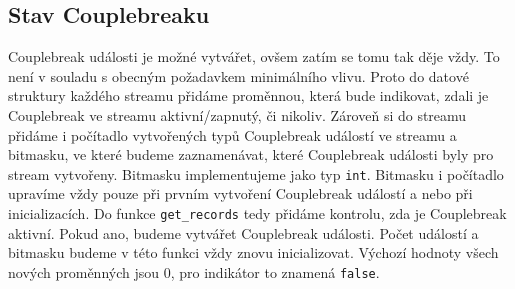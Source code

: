 \subsection{Stav Couplebreaku}
Couplebreak události je možné vytvářet, ovšem zatím se tomu tak děje vždy. To není v souladu s obecným požadavkem minimálního vlivu. Proto do datové struktury každého streamu přidáme proměnnou, která bude indikovat, zdali je Couplebreak ve streamu aktivní/zapnutý, či nikoliv. Zároveň si do streamu přidáme i počítadlo vytvořených typů Couplebreak událostí ve streamu a bitmasku, ve které budeme zaznamenávat, které Couplebreak události byly pro stream vytvořeny. Bitmasku implementujeme jako typ \texttt{int}. Bitmasku i počítadlo upravíme vždy pouze při prvním vytvoření Couplebreak událostí a nebo při inicializacích. Do funkce \texttt{get\_records} tedy přidáme kontrolu, zda je Couplebreak aktivní. Pokud ano, budeme vytvářet Couplebreak události. Počet událostí a bitmasku budeme v této funkci vždy znovu inicializovat. Výchozí hodnoty všech nových proměnných jsou 0, pro indikátor to znamená \texttt{false}.

